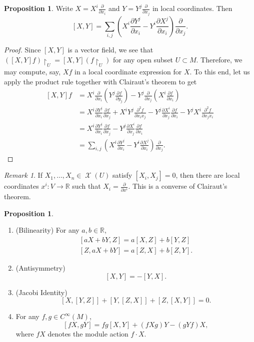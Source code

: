 \documentclass[10pt,letterpaper,cm]{nupset}
\theoremstyle{definition}
\theoremstyle{theorem}
\newtheorem{prop}[definition]{Proposition}
\theoremstyle{remark}
\newtheorem{remark}[definition]{Remark}
\newcommand{\R}{\mathbb R}
\newcommand{\1}{\mathbf{1}}
\newcommand{\0}{\vec 0}
\DeclareMathOperator{\vf}{\mathscr{X}}
\begin{document}
\begin{prop}
Write $X = X^i\frac{\partial}{\partial{x_i}}$ and $Y = Y^j \frac{\partial}{\partial{x_j}}$ in local coordinates. Then $$\left[X, Y\right] = \sum_{i, j}\left(X^i \frac{\partial{Y^j}}{\partial{x_i}} - Y^i\frac{\partial{X^j}}{\partial{x_i}}\right)\frac{\partial}{\partial{x_j}}.$$
\end{prop}
\begin{proof}
Since $\left[X, Y\right]$ is a vector field, we see that $\left(\left[X, Y\right]f\right) \restriction_U = \left[X, Y\right](f\restriction_U)$ for any open subset $U \subset M$. Therefore, we may compute, say, $Xf$ in a local coordinate expression for $X$.  To this end, let us apply the product rule together with Clairaut's theorem to get
\begin{align*}
\left[X, Y\right]f & = X^i \frac{\partial}{\partial{x_i}} \left(Y^j \frac{\partial{f}}{\partial{y_j}}\right) - Y^j \frac{\partial}{\partial{x_j}} \left(X^i \frac{\partial{f}}{\partial{x_i}}\right) 
\\ & =  X^i \frac{\partial{Y^j}}{\partial{x_i}}\frac{\partial{f}}{\partial{x_j}} + X^i Y^j \frac{\partial^2{f}}{\partial{x_i}{x_j}} - Y^j \frac{\partial{X^i}}{\partial{x_j}}\frac{\partial{f}}{\partial{x_i}} - Y^j X^i \frac{\partial^2{f}}{\partial{x_j}{x_i}}
 \\ & = X^i \frac{\partial{Y^j}}{\partial{x_i}}\frac{\partial{f}}{\partial{x_j}} -  Y^j \frac{\partial{X^i}}{\partial{x_j}}\frac{\partial{f}}{\partial{x_i}} 
 \\ & = \sum_{i, j}\left(X^i \frac{\partial{Y^j}}{\partial{x_i}} - Y^i\frac{\partial{X^j}}{\partial{x_i}}\right)\frac{\partial}{\partial{x_j}}.
 \end{align*}
\end{proof}

\begin{remark}
If $X_1, \ldots, X_n \in \vf(U)$ satisfy $\left[X_i, X_j\right]= 0$, then there are local coordinates $x^i : V \to \R$ such that $X_i  =\frac{\partial}{\partial{x^i}}$. This is a converse of Clairaut's theorem.
\end{remark}

\begin{prop} $ $
\begin{enumerate}
\item (Bilinearity) For any $a,b \in \R$, 
\begin{gather*}
\left[aX + bY, Z\right] = a[X, Z] + b[Y, Z]
\\ \left[Z, aX + bY\right] = a[Z, X] + b[Z, Y]. 
\end{gather*}
\item (Antisymmetry) $$\left[X, Y\right] = {-[Y,X]}.$$
\item (Jacobi Identity) $$\left[X, [Y, Z]\right]+ \left[Y, [Z, X]\right] + \left[Z, \left[X, Y\right]\right] =0  . $$
\item For any $f, g \in C^{\infty}(M)$, $$\left[fX, gY\right] = fg\left[X, Y\right] + \left(fXg\right)Y - \left(gYf\right)X, $$ where $fX$ denotes the module action $f \cdot X$.
\end{enumerate}
\end{prop}
\end{document}
